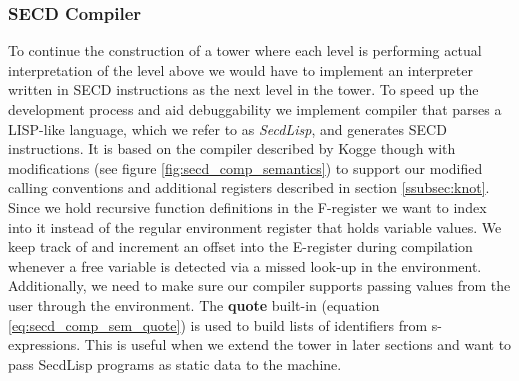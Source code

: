 \documentclass[a4paper,12pt,twoside,openright]{report}
\theoremstyle{definition}
\newcommand{\secdlisp}{SecdLisp}
\begin{document}
\subsubsection{SECD Compiler}\label{subsec:secd_comp}
To continue the construction of a tower where each level is performing actual interpretation of the level above we would have to implement an interpreter written in SECD instructions as the next level in the tower. To speed up the development process and aid debuggability we implement compiler that parses a LISP-like language, which we refer to as \textit{\secdlisp{}}, and generates SECD instructions. It is based on the compiler described by Kogge \cite{kogge1990architecture} though with modifications (see figure \ref{fig:secd_comp_semantics}) to support our modified calling conventions and additional registers described in section \ref{ssubsec:knot}. Since we hold recursive function definitions in the F-register we want to index into it instead of the regular environment register that holds variable values. We keep track of and increment an offset into the E-register during compilation whenever a free variable is detected via a missed look-up in the environment. Additionally, we need to make sure our compiler supports passing values from the user through the environment. The \textbf{quote} built-in (equation \ref{eq:secd_comp_sem_quote}) is used to build lists of identifiers from s-expressions. This is useful when we extend the tower in later sections and want to pass \secdlisp{} programs as static data to the machine.
\end{document}

